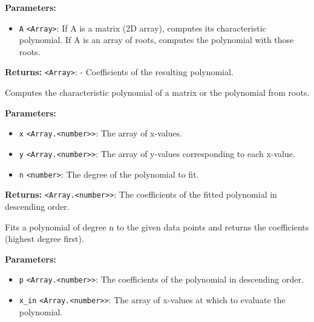 \documentclass[12pt,a4paper]{article}
\begin{document}
\noindent \textbf{Parameters:}
\begin{itemize}
  \item \texttt{A} \texttt{<Array>}: If \textasciigrave{}A\textasciigrave{} is a matrix (2D array), computes its characteristic polynomial.
If \textasciigrave{}A\textasciigrave{} is an array of roots, computes the polynomial with those roots.
\end{itemize}

\noindent \textbf{Returns:} \texttt{<Array>}: - Coefficients of the resulting polynomial.

\noindent Computes the characteristic polynomial of a matrix or the polynomial from roots.

\vspace{5mm}
\noindent {}


\noindent \textbf{Parameters:}
\begin{itemize}
  \item \texttt{x} \texttt{<Array.<number>>}: The array of x-values.
  \item \texttt{y} \texttt{<Array.<number>>}: The array of y-values corresponding to each x-value.
  \item \texttt{n} \texttt{<number>}: The degree of the polynomial to fit.
\end{itemize}

\noindent \textbf{Returns:} \texttt{<Array.<number>>}: The coefficients of the fitted polynomial in descending order.

\noindent Fits a polynomial of degree n to the given data points and returns the coefficients (highest degree first).

\vspace{5mm}
\noindent {}


\noindent \textbf{Parameters:}
\begin{itemize}
  \item \texttt{p} \texttt{<Array.<number>>}: The coefficients of the polynomial in descending order.
  \item \texttt{x\_in} \texttt{<Array.<number>>}: The array of x-values at which to evaluate the polynomial.
\end{itemize}
\end{document}
